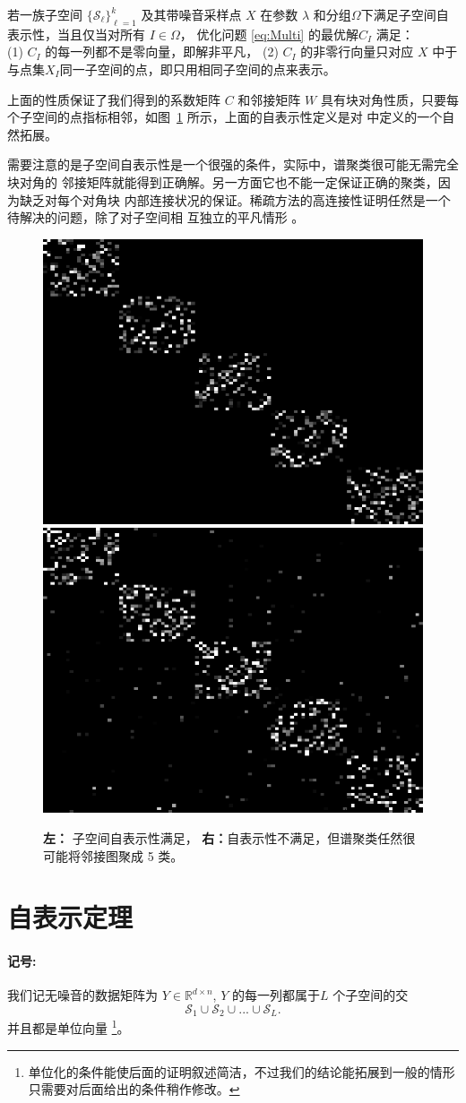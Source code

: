 \documentclass[main.tex]{subfiles}
\begin{document}
\begin{definition}[子空间自表示性]\label{def:lasso_detection}
若一族子空间 $\{\mathcal{S}_{\ell}\}_{\ell=1}^{k}$ 及其带噪音采样点 $X$ 在参数
$\lambda$ 和分组$\Omega$下满足子空间自表示性，当且仅当对所有 $I\in \Omega$，
优化问题 \eqref{eq:Multi} 的最优解$C_I$ 满足：\\
\indent (1) $C_I$ 的每一列都不是零向量，即解非平凡，
\indent (2) $C_I$ 的非零行向量只对应 $X$
中于与点集$X_I$同一子空间的点，即只用相同子空间的点来表示。
\end{definition}
上面的性质保证了我们得到的系数矩阵 $C$ 和邻接矩阵 $W$
具有块对角性质，只要每个子空间的点指标相邻，如图~\ref{fig:SEP}
所示，上面的自表示性定义是对 \cite{elhamifar2012ssc_journal}
中定义的一个自然拓展。

需要注意的是子空间自表示性是一个很强的条件，实际中，谱聚类很可能无需完全块对角的
邻接矩阵就能得到正确解。另一方面它也不能一定保证正确的聚类，因为缺乏对每个对角块
内部连接状况的保证。稀疏方法的高连接性证明任然是一个待解决的问题，除了对子空间相
互独立的平凡情形 \cite{liu2013LRR, wang2013provable}。

\begin{figure}
  \centering
  \includegraphics[width=0.35\linewidth]{pics/SEP.png}
  \includegraphics[width=0.35\linewidth]{pics/ViolateSEP.png}\\
  \caption{\textbf{左：} 子空间自表示性满足， \textbf{右：}自表示性不满足，但谱聚类任然很可能将邻接图聚成 5 类。}
  \label{fig:SEP}
\end{figure}

\section{自表示定理}
\paragraph{记号: }
我们记无噪音的数据矩阵为 $Y \in \mathbb{R}^{d\times n}$,  $Y$ 的每一列都属于$L$
个子空间的交
$$\mathcal{S}_1 \cup \mathcal{S}_2 \cup...\cup \mathcal{S}_L.$$
并且都是单位向量
\footnote{单位化的条件能使后面的证明叙述简洁，不过我们的结论能拓展到一般的情形只需要对后面给出的条件稍作修改。}。
\end{document}
